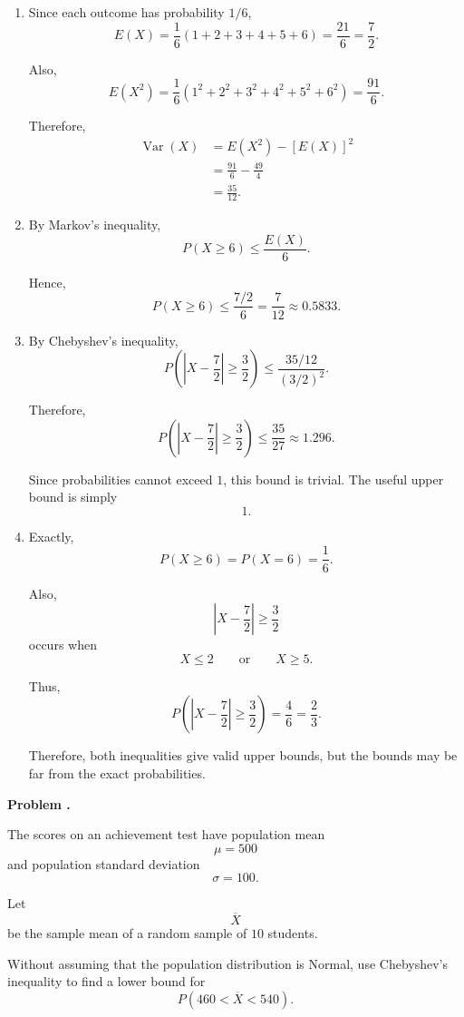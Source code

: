\documentclass[11pt]{article}
\newcounter{problem}
\newenvironment{problem}[1][]{
    \refstepcounter{problem}
    \begin{problemheader}
        \textbf{Problem \theproblem%
        \if\relax\detokenize{#1}\relax
        \else. #1%
        \fi}
    \end{problemheader}
}{
    \vspace{0.5em}
}
\newenvironment{solution}{
    \par
    \begin{tcolorbox}[
        colback=white,
        colframe=uwgold,
        boxrule=0.7pt,
        arc=2mm,
        left=3mm,
        right=3mm,
        top=2mm,
        bottom=2mm,
        breakable,
        before skip=0.5em,
        after skip=1em,
        title=\textbf{Solution},
        coltitle=uwpurple,
        fonttitle=\bfseries
    ]
}{
    \end{tcolorbox}
}
\begin{document}
\begin{solution}

\begin{enumerate}[label=(\alph*)]

\item Since each outcome has probability \(1/6\),
\[
E(X)
=
\frac16(1+2+3+4+5+6)
=
\frac{21}{6}
=
\frac72.
\]

Also,
\[
E(X^2)
=
\frac16
(1^2+2^2+3^2+4^2+5^2+6^2)
=
\frac{91}{6}.
\]

Therefore,
\[
\begin{aligned}
\operatorname{Var}(X)
&=
E(X^2)-[E(X)]^2\\
&=
\frac{91}{6}
-
\frac{49}{4}\\
&=
\frac{35}{12}.
\end{aligned}
\]

\item By Markov's inequality,
\[
P(X\geq6)
\leq
\frac{E(X)}6.
\]

Hence,
\[
P(X\geq6)
\leq
\frac{7/2}{6}
=
\frac7{12}
\approx0.5833.
\]

\item By Chebyshev's inequality,
\[
P\left(
\left|X-\frac72\right|
\geq
\frac32
\right)
\leq
\frac{
35/12
}{
(3/2)^2
}.
\]

Therefore,
\[
P\left(
\left|X-\frac72\right|
\geq
\frac32
\right)
\leq
\frac{35}{27}
\approx1.296.
\]

Since probabilities cannot exceed \(1\), this bound is trivial. The useful
upper bound is simply
\[
1.
\]

\item Exactly,
\[
P(X\geq6)
=
P(X=6)
=
\frac16.
\]

Also,
\[
\left|X-\frac72\right|
\geq
\frac32
\]
occurs when
\[
X\leq2
\qquad\text{or}\qquad
X\geq5.
\]

Thus,
\[
P\left(
\left|X-\frac72\right|
\geq
\frac32
\right)
=
\frac46
=
\frac23.
\]

Therefore, both inequalities give valid upper bounds, but the bounds may be
far from the exact probabilities.

\end{enumerate}

\end{solution}



\newpage
\begin{problem}

The scores on an achievement test have population mean
\[
\mu=500
\]
and population standard deviation
\[
\sigma=100.
\]

Let
\[
\overline X
\]
be the sample mean of a random sample of \(10\) students.

Without assuming that the population distribution is Normal, use Chebyshev's
inequality to find a lower bound for
\[
P(460<\overline X<540).
\]

\end{problem}
\end{document}
